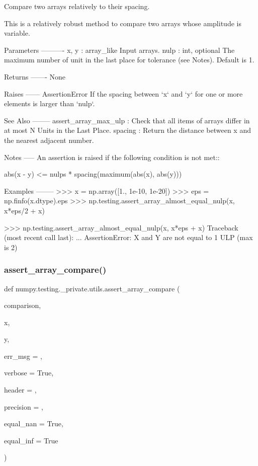\begin{DoxyVerb}Compare two arrays relatively to their spacing.

This is a relatively robust method to compare two arrays whose amplitude
is variable.

Parameters
----------
x, y : array_like
    Input arrays.
nulp : int, optional
    The maximum number of unit in the last place for tolerance (see Notes).
    Default is 1.

Returns
-------
None

Raises
------
AssertionError
    If the spacing between `x` and `y` for one or more elements is larger
    than `nulp`.

See Also
--------
assert_array_max_ulp : Check that all items of arrays differ in at most
    N Units in the Last Place.
spacing : Return the distance between x and the nearest adjacent number.

Notes
-----
An assertion is raised if the following condition is not met::

    abs(x - y) <= nulps * spacing(maximum(abs(x), abs(y)))

Examples
--------
>>> x = np.array([1., 1e-10, 1e-20])
>>> eps = np.finfo(x.dtype).eps
>>> np.testing.assert_array_almost_equal_nulp(x, x*eps/2 + x)

>>> np.testing.assert_array_almost_equal_nulp(x, x*eps + x)
Traceback (most recent call last):
  ...
AssertionError: X and Y are not equal to 1 ULP (max is 2)\end{DoxyVerb}
 \mbox{\label{namespacenumpy_1_1testing_1_1__private_1_1utils_ad360ddc8afeaee54d5304a1bc510661c}} 
\subsubsection{\texorpdfstring{assert\+\_\+array\+\_\+compare()}{assert\_array\_compare()}}
{\footnotesize\ttfamily def numpy.\+testing.\+\_\+private.\+utils.\+assert\+\_\+array\+\_\+compare (\begin{DoxyParamCaption}\item[{}]{comparison,  }\item[{}]{x,  }\item[{}]{y,  }\item[{}]{err\+\_\+msg = {\ttfamily \textquotesingle{}\textquotesingle{}},  }\item[{}]{verbose = {\ttfamily True},  }\item[{}]{header = {\ttfamily \textquotesingle{}\textquotesingle{}},  }\item[{}]{precision = {},  }\item[{}]{equal\+\_\+nan = {\ttfamily True},  }\item[{}]{equal\+\_\+inf = {\ttfamily True} }\end{DoxyParamCaption})}

